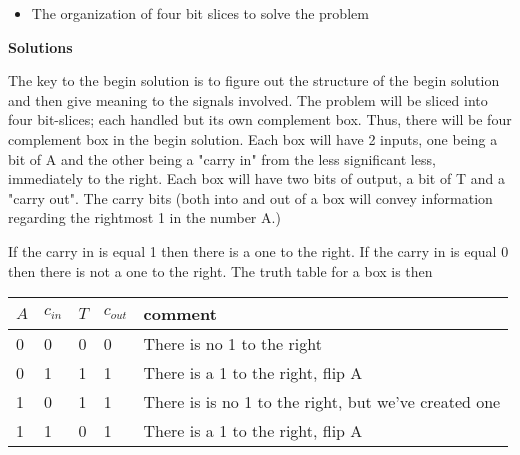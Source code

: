 \begin{enumerate}
\begin{itemize}
\begin{onlysolution}
                    \end{onlysolution}
                \item The organization of four bit slices to solve the problem
                    \begin{onlysolution}

                    \end{onlysolution}
            \end{itemize}

            \begin{onlysolution} \textbf{Solutions} \itshape{
                    The key to the begin solution  is to figure out the structure
                    of the begin solution  and then give meaning to the signals involved.
                    The problem will be sliced into four bit-slices; each handled
                    but its own complement box.  Thus, there will be four complement
                    box in the begin solution.  Each box will have 2 inputs, one being
                    a bit of A and the other being a "carry in" from the less
                    significant less, immediately to the right.  Each box
                    will have two bits of output, a bit of T and a "carry out".
                    The carry bits (both into and out of a box will convey
                    information regarding the rightmost 1 in the number A.)

                    If the carry in is equal 1 then there is a one to the right.
                    If the carry in is equal 0 then there is not a one to the right.
                    The truth table for a box is then

                    \begin{table}[h]
                        \begin{tabular}{l|l||l|l|l}
                            $A$ & $c_{in}$  & $T$ & $c_{out}$ & comment \\ \hline
                            0   & 0       &   0 & 0          & There is no 1 to the right \\ \hline
                            0   & 1       &   1 & 1          & There is a 1 to the right, flip A \\ \hline
                            1   & 0       &   1 & 1          & There is is no 1 to the right, but we've
                            created one \\ \hline
                            1   & 1       &   0 & 1          & There is a 1 to the right, flip A \\
                        \end{tabular}
                    \end{table}

}
\end{onlysolution}
\end{enumerate}
